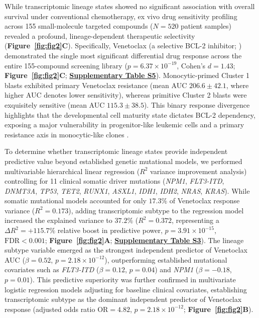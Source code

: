 \documentclass[11pt,a4paper]{article}
\begin{document}
While transcriptomic lineage states showed no significant association with overall survival under conventional chemotherapy, ex vivo drug sensitivity profiling across 155 small-molecule targeted compounds ($N=520$ patient samples) revealed a profound, lineage-dependent therapeutic selectivity (\textbf{Figure~\ref{fig:fig2}C}). Specifically, Venetoclax (a selective BCL-2 inhibitor; \cite{souers2013abt199,pan2014bcl2}) demonstrated the single most significant differential drug response across the entire 155-compound screening library ($p=6.37\times10^{-19}$, Cohen's $d=1.43$; \textbf{Figure~\ref{fig:fig2}C}; \href{Supplementary_Methods.pdf}{\textbf{Supplementary Table S5}}). Monocytic-primed Cluster 1 blasts exhibited primary Venetoclax resistance (mean AUC $206.6 \pm 42.1$, where higher AUC denotes lower sensitivity), whereas primitive Cluster 2 blasts were exquisitely sensitive (mean AUC $115.3 \pm 38.5$). This binary response divergence highlights that the developmental cell maturity state dictates BCL-2 dependency, exposing a major vulnerability in progenitor-like leukemic cells and a primary resistance axis in monocytic-like clones \cite{lagadinou2013bcl2,pollyea2018oxphos,jones2018oxphos}.

To determine whether transcriptomic lineage states provide independent predictive value beyond established genetic mutational models, we performed multivariable hierarchical linear regression ($R^2$ variance improvement analysis) controlling for 11 clinical somatic driver mutations (\textit{NPM1}, \textit{FLT3-ITD}, \textit{DNMT3A}, \textit{TP53}, \textit{TET2}, \textit{RUNX1}, \textit{ASXL1}, \textit{IDH1}, \textit{IDH2}, \textit{NRAS}, \textit{KRAS}). While somatic mutational models accounted for only $17.3\%$ of Venetoclax response variance ($R^2=0.173$), adding transcriptomic subtype to the regression model increased the explained variance to $37.2\%$ ($R^2=0.372$, representing a $\Delta R^2=+115.7\%$ relative boost in predictive power, $p=3.91\times10^{-15}$, $\text{FDR}<0.001$; \textbf{Figure~\ref{fig:fig2}A}; \href{Supplementary_Methods.pdf}{\textbf{Supplementary Table S3}}). The lineage subtype variable emerged as the strongest independent predictor of Venetoclax AUC ($\beta = 0.52$, $p=2.18\times10^{-12}$), outperforming established mutational covariates such as \textit{FLT3-ITD} ($\beta = 0.12$, $p=0.04$) and \textit{NPM1} ($\beta = -0.18$, $p=0.01$). This predictive superiority was further confirmed in multivariate logistic regression models adjusting for baseline clinical covariates, establishing transcriptomic subtype as the dominant independent predictor of Venetoclax response (adjusted odds ratio $\text{OR}=4.82$, $p=2.18\times10^{-12}$; \textbf{Figure~\ref{fig:fig2}B}).
\end{document}
